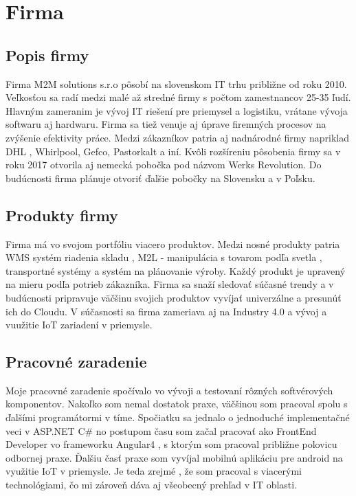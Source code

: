 \chapter{Firma} %

\section{Popis firmy}
Firma M2M solutions s.r.o \cite{firma} pôsobí na slovenskom  IT  trhu približne od roku 2010. Veľkosťou sa radí medzi malé až stredné  firmy s počtom zamestnancov 25-35 ľudí. Hlavným zameranim je vývoj IT riešení pre priemysel  a logistiku, vrátane vývoja  softwaru aj hardwaru. Firma sa tiež venuje aj úprave firemných procesov  na zvýšenie efektivity práce.  Medzi zákazníkov patria aj nadnárodné firmy napriklad DHL , Whirlpool, Gefco, Pastorkalt a iní.  Kvôli rozšíreniu  pôsobenia  firmy  sa  v roku 2017 otvorila  aj nemecká pobočka pod názvom Werks Revolution. Do budúcnosti firma plánuje otvoriť ďalšie pobočky na Slovensku a v Poľsku.

\section{Produkty firmy}
Firma má  vo svojom portfóliu viacero produktov. Medzi nosné produkty patria WMS  systém riadenia skladu ,  M2L - manipulácia s tovarom podľa svetla , transportné systémy a systém na  plánovanie výroby. Každý produkt je upravený na mieru podľa potrieb zákazníka. Firma sa snaží sledovať súčasné trendy a v budúcnosti  pripravuje väčšinu svojich produktov  vyvíjať univerzálne a presunúť ich do Cloudu.  V súčasnosti sa firma zameriava aj na Industry 4.0 a vývoj a vuužitie IoT zariadení v priemysle. 

\section{Pracovné zaradenie}
Moje pracovné zaradenie  spočívalo vo vývoji a testovaní rôzných softvérových komponentov. Nakoľko som nemal  dostatok praxe, väčšinou som pracoval spolu  s ďalšími programátormi v tíme. Spočiatku sa jednalo o jednoduché implementačné veci v ASP.NET C\#  no postupom času  som začal pracovať ako FrontEnd Developer vo frameworku Angular4 , s ktorým som pracoval približne polovicu odbornej praxe. Ďalšiu časť praxe som vyvíjal mobilnú aplikáciu  pre android na využitie IoT v priemysle.  Je teda zrejmé , že som pracoval s viacerými technológiami, čo mi zároveň dáva aj všeobecný prehľad v IT oblasti.
